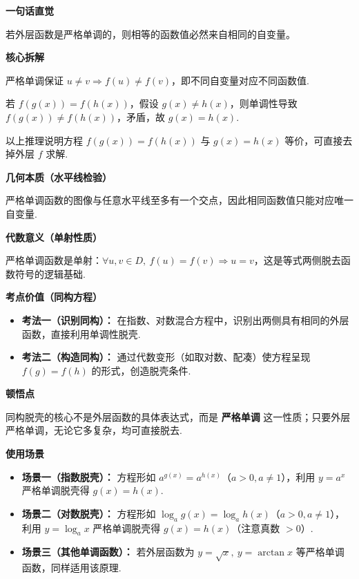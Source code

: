 \begin{explanationbox}
	\textbf{\textcolor{CExplanation}{一句话直觉}}

	若外层函数是严格单调的，则相等的函数值必然来自相同的自变量。

	\medskip
	\textbf{\textcolor{CExplanation}{核心拆解}}
	\begin{description}[style=nextline, leftmargin=2.8em, labelsep=0.5em, itemsep=0.45em]
		\item[\textbf{要点一（严格单调）：}] 严格单调保证 $u\neq v \Rightarrow f(u)\neq f(v)$，即不同自变量对应不同函数值.
		\item[\textbf{要点二（逆推唯一性）：}] 若 $f(g(x))=f(h(x))$，假设 $g(x)\neq h(x)$，则单调性导致 $f(g(x))\neq f(h(x))$，矛盾，故 $g(x)=h(x)$.
		\item[\textbf{要点三（方程脱壳）：}] 以上推理说明方程 $f(g(x))=f(h(x))$ 与 $g(x)=h(x)$ 等价，可直接去掉外层 $f$ 求解.
	\end{description}

	\medskip
	\textbf{\textcolor{CExplanation}{几何本质（水平线检验）}}

	严格单调函数的图像与任意水平线至多有一个交点，因此相同函数值只能对应唯一自变量.

	\medskip
	\textbf{\textcolor{CExplanation}{代数意义（单射性质）}}

	严格单调函数是单射：$\forall u,v\in D,\ f(u)=f(v) \Rightarrow u=v$，这是等式两侧脱去函数符号的逻辑基础.

	\medskip
	\textbf{\textcolor{CExplanation}{考点价值（同构方程）}}
	\begin{itemize}[leftmargin=*, itemsep=0.5em, topsep=0.4em]
		\item \textbf{考法一（识别同构）：} 在指数、对数混合方程中，识别出两侧具有相同的外层函数，直接利用单调性脱壳.
		\item \textbf{考法二（构造同构）：} 通过代数变形（如取对数、配凑）使方程呈现 $f(g)=f(h)$ 的形式，创造脱壳条件.
	\end{itemize}

	\medskip
	\textbf{\textcolor{CExplanation}{顿悟点}}

	同构脱壳的核心不是外层函数的具体表达式，而是 \textbf{严格单调} 这一性质；只要外层严格单调，无论它多复杂，均可直接脱去.

	\medskip
	\textbf{\textcolor{CExplanation}{使用场景}}
	\begin{itemize}[leftmargin=*, itemsep=0.5em, topsep=0.4em]
		\item \textbf{场景一（指数脱壳）：} 方程形如 $a^{g(x)}=a^{h(x)}$（$a>0,a\neq1$），利用 $y=a^x$ 严格单调脱壳得 $g(x)=h(x)$.
		\item \textbf{场景二（对数脱壳）：} 方程形如 $\log_a g(x)=\log_a h(x)$（$a>0,a\neq1$），利用 $y=\log_a x$ 严格单调脱壳得 $g(x)=h(x)$（注意真数 $>0$）.
		\item \textbf{场景三（其他单调函数）：} 若外层函数为 $y=\sqrt{x},\ y=\arctan x$ 等严格单调函数，同样适用该原理.
	\end{itemize}
\end{explanationbox}
